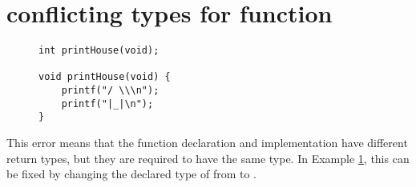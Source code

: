 \section{conflicting types for function}\label{sec:conflicting-types}

\begin{figure}[htb]
\begin{lstlisting}
int printHouse(void);

void printHouse(void) {
	printf("/ \\\n");
	printf("|_|\n");
}
\end{lstlisting}
\label{ex:conflict-types}
\end{figure}

This error means that the function declaration and implementation have different return types, but they are required to have the same type.
In Example \ref{ex:conflict-types}, this can be fixed by changing the declared type of  from  to .

\newpage